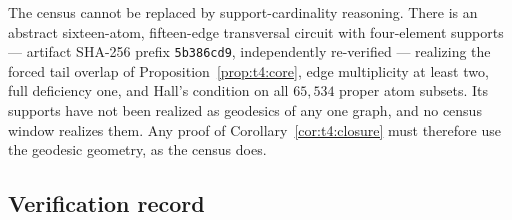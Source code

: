 \begin{remark}\label{rem:t4:abstract}
The census cannot be replaced by support-cardinality reasoning. There
is an abstract sixteen-atom, fifteen-edge transversal circuit with
four-element supports --- artifact SHA-256 prefix \texttt{5b386cd9},
independently re-verified --- realizing the forced tail overlap of
Proposition~\ref{prop:t4:core}, edge multiplicity at least two, full
deficiency one, and Hall's condition on all \(65{,}534\) proper atom
subsets. Its supports have not been realized as geodesics of any one
graph, and no census window realizes them.
Any proof of Corollary~\ref{cor:t4:closure} must therefore use the
geodesic geometry, as the census does.
\end{remark}

\subsection*{Verification record}

